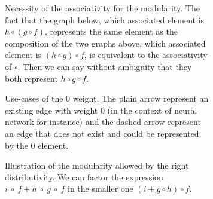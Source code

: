 \documentclass[11pt,a4paper]{article}
\theoremstyle{definition}
\begin{document}
\begin{figure}
\begin{subfigure}{\textwidth}
		\caption{Necessity of the associativity for the modularity. The fact that the graph below, which associated element is $h\circ (g \circ f)$, represents the same element as the composition of the two graphs above, which associated element is $(h \circ g) \circ f$, is equivalent to the associativity of $\circ$. Then we can say without ambiguity that they both represent $h \circ g \circ f$.}
	\end{subfigure}

	\begin{subfigure}{\textwidth}
		\centering
		\caption{Use-cases of the 0 weight. The plain arrow represent an existing edge with weight 0 (in the context of neural network for instance) and the dashed arrow represent an edge that does not exist and could be represented by the 0 element.}
	\end{subfigure}

	\begin{subfigure}{\textwidth}
		\centering
		\caption{Illustration of the modularity allowed by the right distributivity. We can factor the expression $i~\circ~f+h~\circ~g~\circ~f$ in the smaller one $(i + g \circ h) \circ f$.}
	\end{subfigure}

	\begin{subfigure}{\textwidth}
		\centering
\end{subfigure}
\end{figure}
\end{document}
